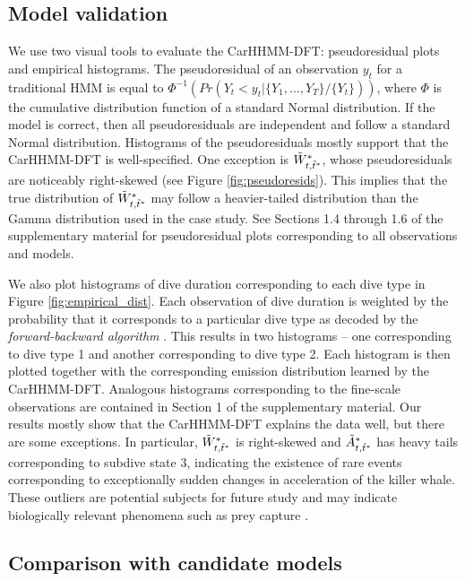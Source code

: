 \subsection{Model validation}
\label{subsec:model_validation}

We use two visual tools to evaluate the CarHHMM-DFT: pseudoresidual plots and empirical histograms. The pseudoresidual of an observation $y_t$ for a traditional HMM is equal to $\Phi^{-1} \left(Pr(Y_t < y_t|\{Y_1,\ldots,Y_T\}/\{Y_t\}) \right)$, where $\Phi$ is the cumulative distribution function of a standard Normal distribution. If the model is correct, then all pseudoresiduals are independent and follow a standard Normal distribution. Histograms of the pseudoresiduals mostly support that the CarHHMM-DFT is well-specified. One exception is $\tilde{W}^*_{t,\tilde t^*}$, whose pseudoresiduals are noticeably right-skewed (see Figure \ref{fig:pseudoresids}). This implies that the true distribution of $\tilde{W}^*_{t,\tilde t^*}$ may follow a heavier-tailed distribution than the Gamma distribution used in the case study. See Sections 1.4 through 1.6 of the supplementary material for pseudoresidual plots corresponding to all observations and models.

We also plot histograms of dive duration corresponding to each dive type in Figure \ref{fig:empirical_dist}. Each observation of dive duration is weighted by the probability that it corresponds to a particular dive type as decoded by the \textit{forward-backward algorithm} \citep{Zucchini:2016}. This results in two histograms -- one corresponding to dive type 1 and another corresponding to dive type 2. Each histogram is then plotted together with the corresponding emission distribution learned by the CarHHMM-DFT. Analogous histograms corresponding to the fine-scale observations are contained in Section 1 of the supplementary material. Our results mostly show that the CarHHMM-DFT explains the data well, but there are some exceptions. In particular, $\tilde{W}^*_{t,\tilde t^*}$ is right-skewed and $\tilde{A}^*_{t,\tilde t^*}$ has heavy tails corresponding to subdive state 3, indicating the existence of rare events corresponding to exceptionally sudden changes in acceleration of the killer whale. These outliers are potential subjects for future study and may indicate biologically relevant phenomena such as prey capture \citep{Tennessen:2019a}.

\subsection{Comparison with candidate models}

